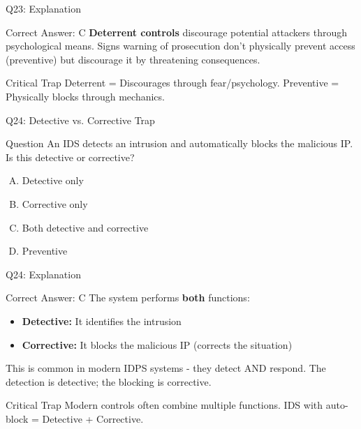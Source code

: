 \documentclass{beamer}
\begin{document}
	\begin{frame}{Q23: Explanation}
		\begin{block}{Correct Answer: C}
			\textbf{Deterrent controls} discourage potential attackers through psychological means. Signs warning of prosecution don't physically prevent access (preventive) but discourage it by threatening consequences.
		\end{block}
		\begin{alertblock}{Critical Trap}
			Deterrent = Discourages through fear/psychology.
			Preventive = Physically blocks through mechanics.
		\end{alertblock}
	\end{frame}
	
	\begin{frame}{Q24: Detective vs. Corrective Trap}
		\begin{block}{Question}
			An IDS detects an intrusion and automatically blocks the malicious IP. Is this detective or corrective?
		\end{block}
		\begin{enumerate}[(A)]
			\item Detective only
			\item Corrective only
			\item Both detective and corrective
			\item Preventive
		\end{enumerate}
	\end{frame}
	
	\begin{frame}{Q24: Explanation}
		\begin{block}{Correct Answer: C}
			The system performs \textbf{both} functions:
			\begin{itemize}
				\item \textbf{Detective:} It identifies the intrusion
				\item \textbf{Corrective:} It blocks the malicious IP (corrects the situation)
			\end{itemize}
			This is common in modern IDPS systems - they detect AND respond. The detection is detective; the blocking is corrective.
		\end{block}
		\begin{alertblock}{Critical Trap}
			Modern controls often combine multiple functions.
			IDS with auto-block = Detective + Corrective.
		\end{alertblock}
	\end{frame}
	
\end{document}
